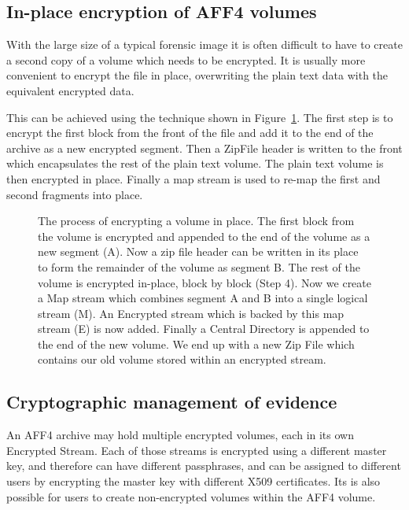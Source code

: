 \documentclass[10pt, conference]{IEEEtran}
\begin{document}
\subsection{In-place encryption of AFF4 volumes}
With the large size of a typical forensic image it is often difficult
to have to create a second copy of a volume which needs to be
encrypted. It is usually more convenient to encrypt the file in place,
overwriting the plain text data with the equivalent encrypted data.

This can be achieved using the technique shown in
Figure~\ref{inplace_crypto}. The first step is to encrypt the first
block from the front of the file and add it to the end of the archive
as a new encrypted segment. Then a ZipFile header is written to the
front which encapsulates the rest of the plain text volume. The plain
text volume is then encrypted in place. Finally a map stream is used
to re-map the first and second fragments into place.

\begin{figure}[tb]
  \begin{center}
  \mbox{\columnwidth {}}

  \caption{The process of encrypting a volume in place. The first
  block from the volume is encrypted and appended to the end of the
  volume as a new segment (A). Now a zip file header can be written in
  its place to form the remainder of the volume as segment B. The rest
  of the volume is encrypted in-place, block by block (Step 4). Now we
  create a Map stream which combines segment A and B into a single
  logical stream (M). An Encrypted stream which is backed by this map
  stream (E) is now added. Finally a Central Directory is appended to
  the end of the new volume. We end up with a new Zip File which
  contains our old volume stored within an encrypted stream.}

  \label{inplace_crypto}
  \end{center}
\end{figure}


\subsection{Cryptographic management of evidence}
An AFF4 archive may hold multiple encrypted volumes, each in its own
Encrypted Stream. Each of those streams is encrypted using a different
master key, and therefore can have different passphrases, and can be
assigned to different users by encrypting the master key with
different X509 certificates. Its is also possible for users to create
non-encrypted volumes within the AFF4 volume.
\end{document}
